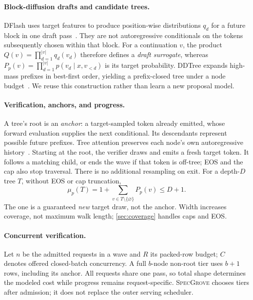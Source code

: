 \documentclass{article}
\newcommand{\method}{\textsc{SpecGrove}\xspace}
\begin{document}
\paragraph{Block-diffusion drafts and candidate trees.}
DFlash uses target features to produce position-wise distributions $q_d$ for a future block in one draft pass~\citep{chen2026dflash}. They are not autoregressive conditionals on the tokens subsequently chosen within that block. For a continuation $v$, the product $Q(v)=\prod_{d=1}^{|v|}q_d(v_d)$ therefore defines a \emph{draft surrogate}, whereas $P_p(v)=\prod_{d=1}^{|v|}p(v_d\mid x,v_{<d})$ is its target probability. DDTree expands high-mass prefixes in best-first order, yielding a prefix-closed tree under a node budget~\citep{ringel2026ddtree}. We reuse this construction rather than learn a new proposal model.

\paragraph{Verification, anchors, and progress.}
A tree's root is an \emph{anchor}: a target-sampled token already emitted, whose forward evaluation supplies the next conditional. Its descendants represent possible future prefixes. Tree attention preserves each node's own autoregressive history~\citep{miao2024specinfer,ringel2026ddtree}. Starting at the root, the verifier draws and emits a fresh target token. It follows a matching child, or ends the wave if that token is off-tree; EOS and the cap also stop traversal. There is no additional resampling on exit. For a depth-$D$ tree $T$, without EOS or cap truncation,
\begin{equation}
\mu_p(T)=1+\sum_{v\in T\setminus\{\varnothing\}}P_p(v)\le D+1.
\label{eq:true-utility}
\end{equation}
The one is a guaranteed \emph{new} target draw, not the anchor. Width increases coverage, not maximum walk length; \cref{sec:coverage} handles caps and EOS.

\paragraph{Concurrent verification.}
Let $n$ be the admitted requests in a wave and $R$ its packed-row budget; $C$ denotes offered closed-batch concurrency. A full $b$-node non-root tier uses $b+1$ rows, including its anchor. All requests share one pass, so total shape determines the modeled cost while progress remains request-specific. \method chooses tiers after admission; it does not replace the outer serving scheduler.
\end{document}
